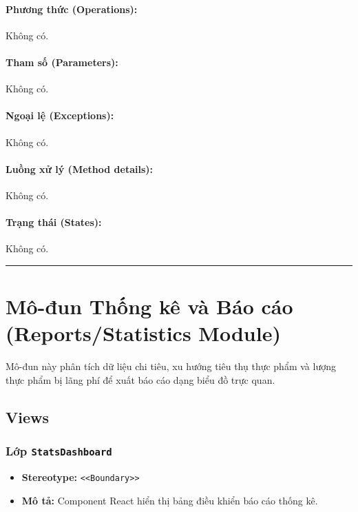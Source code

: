 \documentclass[12pt,a4paper]{article}
\begin{document}
\paragraph{Phương thức (Operations):}
Không có.

\paragraph{Tham số (Parameters):}
Không có.

\paragraph{Ngoại lệ (Exceptions):}
Không có.

\paragraph{Luồng xử lý (Method details):}
Không có.

\paragraph{Trạng thái (States):}
Không có.

\vskip 0.5cm
\noindent\rule{\textwidth}{0.5pt}
\vskip 0.5cm

\section{Mô-đun Thống kê và Báo cáo (Reports/Statistics Module)}


Mô-đun này phân tích dữ liệu chi tiêu, xu hướng tiêu thụ thực phẩm và lượng thực phẩm bị lãng phí để xuất báo cáo dạng biểu đồ trực quan.

\subsection{Views}


\subsubsection{Lớp \texttt{StatsDashboard}}

\begin{itemize}[leftmargin=*]
    \item \textbf{Stereotype:} \texttt{\textless{}\textless{}Boundary\textgreater{}\textgreater{}}
    \item \textbf{Mô tả:} Component React hiển thị bảng điều khiển báo cáo thống kê.
\end{itemize}
\end{document}
